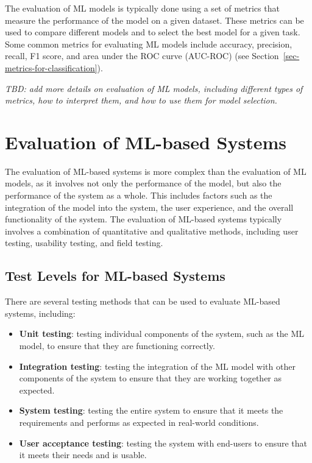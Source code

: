 \documentclass[
  letterpaper,
  DIV=11,
  numbers=noendperiod,
  oneside]{scrreprt}
\begin{document}
\begin{tcolorbox}
The evaluation of ML models is typically done using a set of metrics
that measure the performance of the model on a given dataset. These
metrics can be used to compare different models and to select the best
model for a given task. Some common metrics for evaluating ML models
include accuracy, precision, recall, F1 score, and area under the ROC
curve (AUC-ROC) (see Section~\ref{sec-metrics-for-classification}).

\emph{TBD: add more details on evaluation of ML models, including
different types of metrics, how to interpret them, and how to use them
for model selection.}

\chapter{Evaluation of ML-based
Systems}\label{evaluation-of-ml-based-systems}

The evaluation of ML-based systems is more complex than the evaluation
of ML models, as it involves not only the performance of the model, but
also the performance of the system as a whole. This includes factors
such as the integration of the model into the system, the user
experience, and the overall functionality of the system. The evaluation
of ML-based systems typically involves a combination of quantitative and
qualitative methods, including user testing, usability testing, and
field testing.

\section{Test Levels for ML-based
Systems}\label{test-levels-for-ml-based-systems}

There are several testing methods that can be used to evaluate ML-based
systems, including:

\begin{itemize}
\item
  \textbf{Unit testing}: testing individual components of the system,
  such as the ML model, to ensure that they are functioning correctly.
\item
  \textbf{Integration testing}: testing the integration of the ML model
  with other components of the system to ensure that they are working
  together as expected.
\item
  \textbf{System testing}: testing the entire system to ensure that it
  meets the requirements and performs as expected in real-world
  conditions.
\item
  \textbf{User acceptance testing}: testing the system with end-users to
  ensure that it meets their needs and is usable.
\end{itemize}


\end{tcolorbox}
\end{document}
